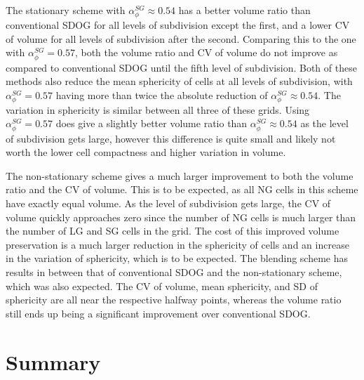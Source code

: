 The stationary scheme with $\alpha_{\phi}^{SG} \approx 0.54$ has a better volume ratio than conventional SDOG for all levels of subdivision except the first, and a lower CV of volume for all levels of subdivision after the second.
Comparing this to the one with $\alpha_{\phi}^{SG} = 0.57$, both the volume ratio and CV of volume do not improve as compared to conventional SDOG until the fifth level of subdivision.
Both of these methods also reduce the mean sphericity of cells at all levels of subdivision, with $\alpha_{\phi}^{SG} = 0.57$ having more than twice the absolute reduction of $\alpha_{\phi}^{SG} \approx 0.54$.
The variation in sphericity is similar between all three of these grids.
Using $\alpha_{\phi}^{SG} = 0.57$ does give a slightly better volume ratio than $\alpha_{\phi}^{SG} \approx 0.54$ as the level of subdivision gets large, however this difference is quite small and likely not worth the lower cell compactness and higher variation in volume.


The non-stationary scheme gives a much larger improvement to both the volume ratio and the CV of volume.
This is to be expected, as all NG cells in this scheme have exactly equal volume.
As the level of subdivision gets large, the CV of volume quickly approaches zero since the number of NG cells is much larger than the number of LG and SG cells in the grid.
The cost of this improved volume preservation is a much larger reduction in the sphericity of cells and an increase in the variation of sphericity, which is to be expected.
The blending scheme has results in between that of conventional SDOG and the non-stationary scheme, which was also expected.
The CV of volume, mean sphericity, and SD of sphericity are all near the respective halfway points, whereas the volume ratio still ends up being a significant improvement over conventional SDOG.

\section{Summary}